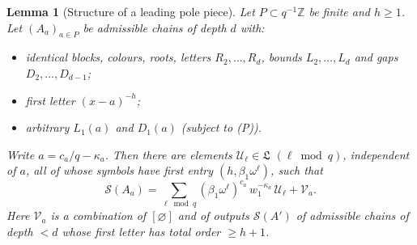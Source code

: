 \documentclass[11pt]{amsart}
\newtheorem{lemma}[theorem]{Lemma}
\theoremstyle{definition}
\theoremstyle{remark}
\numberwithin{equation}{section}
\newcommand{\Z}{\mathbb{Z}}
\newcommand{\cS}{\mathcal{S}}
\newcommand{\fL}{\mathfrak{L}}
\begin{document}
\begin{lemma}[Structure of a leading pole piece]\label{lem:structure}
Let $P\subset q^{-1}\Z$ be finite and $h\ge1$. Let $(A_a)_{a\in P}$ be admissible chains of depth $d$ with:
\begin{itemize}[leftmargin=1.5em]
\item identical blocks, colours, roots, letters $R_2,\dots,R_d$, bounds $L_2,\dots,L_d$ and gaps $D_2,\dots,D_{d-1}$;
\item first letter $(x-a)^{-h}$;
\item arbitrary $L_1(a)$ and $D_1(a)$ (subject to (P)).
\end{itemize}
Write $a=c_a/q-\kappa_a$. Then there are elements $\mathcal U_\ell\in\fL$ $(\ell\bmod q)$, \emph{independent of $a$}, all of whose symbols have first entry $(h,\beta_1\omega^\ell)$, such that
\[
\cS(A_a)=\sum_{\ell\bmod q}(\beta_1\omega^\ell)^{c_a}\,w_1^{-\kappa_a}\,\mathcal U_\ell+\mathcal V_a .
\]
Here $\mathcal V_a$ is a combination of $[\varnothing]$ and of outputs $\cS(A')$ of admissible chains of depth $<d$ whose first letter has total order $\ge h+1$.
\end{lemma}
\end{document}
